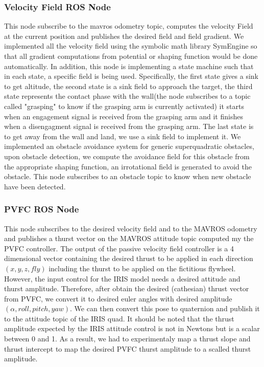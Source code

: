 \subsubsection{Velocity Field ROS Node}
This node subscribe to the mavros odometry topic, computes the velocity Field at the current position and publishes the desired field and field gradient. 
We implemented all the velocity field using the symbolic math library SymEngine so that all gradient computations from potential or shaping function would be done automatically. 
In addition, this node is implementing a state machine such that in each state, a specific field is being used.
Specifically, the first state gives a sink to get altitude, the second state is a sink field to approach the target, 
the third state represents the contact phase with the wall(the node subscribes to a topic called "grasping" to know if the grasping arm is currently activated) it starts when an engagement signal is received from the grasping arm and it finishes when a disengagment signal is received from the grasping arm. 
The last state is to get away from the wall and land, we use a sink field to implement it.
We implemented an obstacle avoidance system for generic superquadratic obstacles, upon obstacle detection, we compute the avoidance field for this obstacle from the appropriate shaping function, an irrotational field is generated to avoid the obstacle. This node subscribes to an obstacle topic to know when new obstacle have been detected. 
\subsubsection{PVFC ROS Node}
This node subscribes to the desired velocity field and to the MAVROS odometry and publishes a thurst vector on the MAVROS attitude topic computed my the PVFC controller. The output of the passive velocity field controller is a 4 dimensional vector containing the desired thrust to be applied in each direction $(x,y,z, fly)$ including the thurst to be applied on the fictitious flywheel. 
However, the input control for the IRIS model needs a desired attitude and thurst amplitude. Therefore, after obtain the desired (cathesian) thrust vector from PVFC, we convert it to desired euler angles with desired amplitude $(\alpha, roll, pitch, yaw)$. 
We can then convert this pose to quaternion and publish it to the attitude topic of the IRIS quad.
It should be noted that the thrust amplitude expected by the IRIS attitude control is not in Newtons but is a scalar between 0 and 1. As a result, we had to experimentaly map a thrust slope and thrust intercept to map the desired PVFC thurst amplitude to a scalled thurst amplitude. 

